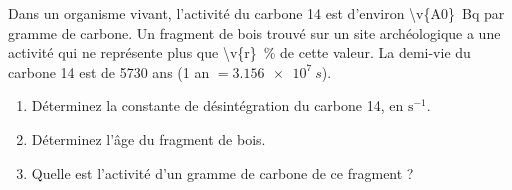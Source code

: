 Dans un organisme vivant, l'activité du carbone 14 est d'environ \qty{\v{A0}}{Bq} par gramme de carbone. Un fragment de bois trouvé sur un site archéologique a une activité qui ne représente plus que \qty{\v{r}}{\percent} de cette valeur. La demi-vie du carbone 14 est de \num{5730} ans (1 an $= \qty{3.156e7}{s}$).

\begin{enumerate}[label=\alph*)]
    \item Déterminez la constante de désintégration du carbone 14, en $\mathrm{s^{-1}}$.
    \item Déterminez l'âge du fragment de bois.
    \item Quelle est l'activité d'un gramme de carbone de ce fragment ?
\end{enumerate}
